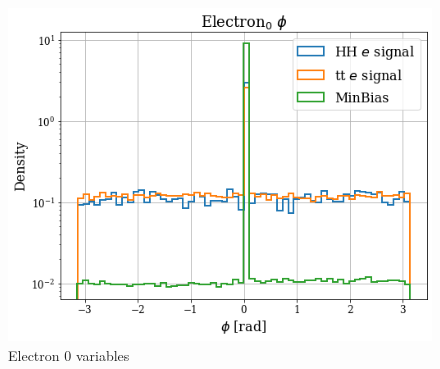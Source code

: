 \documentclass[../main.tex]{subfiles}
\begin{document}
\begin{figure}[!ht]
\begin{minipage}[b]{0.33\linewidth}
  \end{minipage} %
  \begin{minipage}[b]{0.33\linewidth}
    \centering
    \includegraphics[width=1\linewidth]{Chapters/Plots/Hist_1ele_electron0_Phi.png}
  \end{minipage}
  \caption{Electron 0 variables}
\end{figure}
\end{document}
